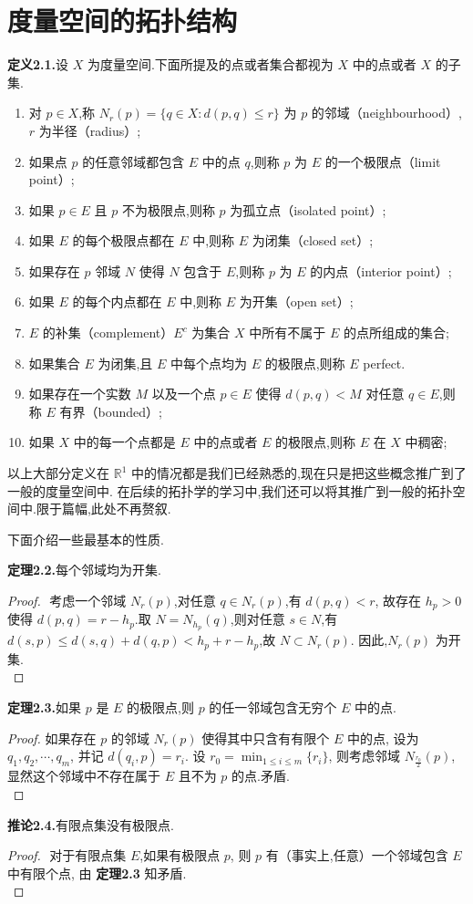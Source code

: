 \documentclass{article}
\begin{document}
\section{度量空间的拓扑结构}
\textbf{定义2.1.}设 $X$ 为度量空间.下面所提及的点或者集合都视为 $X$ 中的点或者 $X$ 的子集.
\begin{enumerate}[label={\textbullet}]
    \item 对 $p\in X$,称 $N_r(p) = \{q\in X: d(p,q)\leq r\}$ 为 $p$ 的邻域（neighbourhood）,$r$ 为半径（radius）;
    \item 如果点 $p$ 的任意邻域都包含 $E$ 中的点 $q$,则称 $p$ 为 $E$ 的一个极限点（limit point）;
    \item 如果 $p\in E$ 且 $p$ 不为极限点,则称 $p$ 为孤立点（isolated point）;
    \item 如果 $E$ 的每个极限点都在 $E$ 中,则称 $E$ 为闭集（closed set）;
    \item 如果存在 $p$ 邻域 $N$ 使得 $N$ 包含于 $E$,则称 $p$ 为 $E$ 的内点（interior point）;
    \item 如果 $E$ 的每个内点都在 $E$ 中,则称 $E$ 为开集（open set）;
    \item $E$ 的补集（complement）$E^c$ 为集合 $X$ 中所有不属于 $E$ 的点所组成的集合;
    \item 如果集合 $E$ 为闭集,且 $E$ 中每个点均为 $E$ 的极限点,则称 $E$ perfect.
    \item 如果存在一个实数 $M$ 以及一个点 $p\in E$ 使得 $d(p,q)<M$ 对任意 $q\in E$,则称 $E$ 有界（bounded）;
    \item 如果 $X$ 中的每一个点都是 $E$ 中的点或者 $E$ 的极限点,则称 $E$ 在 $X$ 中稠密;
\end{enumerate}

以上大部分定义在 $\mathbb{R}^1$ 中的情况都是我们已经熟悉的,现在只是把这些概念推广到了一般的度量空间中.
在后续的拓扑学的学习中,我们还可以将其推广到一般的拓扑空间中.限于篇幅,此处不再赘叙.

下面介绍一些最基本的性质.

\textbf{定理2.2.}每个邻域均为开集.
\begin{proof}
    $ $
    考虑一个邻域 $N_r(p)$,对任意 $q\in N_r(p)$,有 $d(p,q)<r$,
    故存在 $h_p>0$ 使得 $d(p,q) = r-h_p$.取 $N = N_{h_p}(q)$,则对任意 $s\in N$,有
    $d(s,p)\leq d(s,q)+d(q,p) < h_p+ r-h_p$,故 $N\subset N_r(p)$.
    因此,$N_r(p)$ 为开集.\\
\end{proof}
\textbf{定理2.3.}如果 $p$ 是 $E$ 的极限点,则 $p$ 的任一邻域包含无穷个 $E$ 中的点.
\begin{proof}
    如果存在 $p$ 的邻域 $N_r(p)$ 使得其中只含有有限个 $E$ 中的点,
    设为 $q_1,q_2,\cdots,q_m$,
    并记 $d(q_i,p) = r_i$.
    设 $r_0 = \min_{1\leq i\leq m}\{r_i\}$,
    则考虑邻域 $N_{\frac{r_0}{2}}(p)$,
    显然这个邻域中不存在属于 $E$ 且不为 $p$ 的点.矛盾.\\
\end{proof}
\textbf{推论2.4.}有限点集没有极限点.
\begin{proof}
    $ $
    对于有限点集 $E$,如果有极限点 $p$,
    则 $p$ 有（事实上,任意）一个邻域包含 $E$ 中有限个点,
    由 \textbf{定理2.3} 知矛盾.\\
\end{proof}
\end{document}
